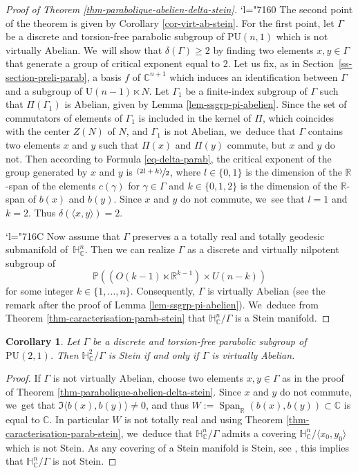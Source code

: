 \documentclass[JEP,XML,SOM,Unicode,NoEqCountersInSection,published]{cedram}
\newcommand{\Changel}{\mathcode`l="7160}
\newcommand{\Changelback}{\mathcode`l="716C}
\newcommand{\psfrac}[2]{\sfrac{(#1)}{#2}}
\newtheorem{corollary}[theorem]{Corollary}
\theoremstyle{definition}
\newcommand{\C}{\mathbb{C}}
\newcommand{\R}{\mathbb{R}}
\newcommand{\HNC}{\mathbb{H}^{n}_{\C}}
\newcommand{\PU}{\mathrm{PU}}
\def\C{\mathbb{C}}
\newcommand{\HNC}{\mathbb{H}^{n}_{\C}}
\newcommand{\PU}{\mathrm{PU}}
\begin{document}
\begin{proof}[Proof of Theorem \ref{thm-parabolique-abelien-delta-stein}]\Changel
The second point of the theorem is given by Corollary \ref{cor-virt-ab-stein}. For the first point, let $\Gamma$ be a discrete and torsion-free parabolic subgroup of $\PU(n,1)$ which is not virtually Abelian. We~will show that $\delta(\Gamma)\ge2$ by finding two elements $x,y\in \Gamma$ that generate a group of critical exponent equal to 2. Let us fix, as in Section~\ref{ss-section-preli-parab}, a basis $f$ of $\C^{n+1}$ which induces an identification between $\Gamma$ and a subgroup of $\mathrm{U}(n-1)\ltimes N$. Let $\Gamma_1$ be a finite-index subgroup of $\Gamma$ such that $\Pi(\Gamma_1)$ is Abelian, given by Lemma \ref{lem-ssgrp-pi-abelien}. Since the set of commutators of elements of $\Gamma_1$ is included in the kernel of $\Pi$, which coincides with the center $Z(N)$ of $N$, and $\Gamma_1$ is not Abelian, we~deduce that $\Gamma$ contains two elements $x$ and $y$ such that $\Pi(x)$ and $\Pi(y)$ commute, but $x$ and $y$ do not. Then according to Formula \eqref{eq-delta-parab}, the critical exponent of the group generated by $x$ and $y$ is $\psfrac{2l+k}{2}$, where $l\in\{0,1\}$ is the dimension of the $\R$-span of the elements $c(\gamma)$ for $\gamma\in\Gamma$ and $k\in\{0,1,2\}$ is the dimension of the $\R$-span of $b(x)$ and $b(y)$. Since $x$ and $y$ do not commute, we~see that $l=1$ and $k=2$. Thus $\delta(\langle x,y\rangle)=2$.

\Changelback
Now assume that $\Gamma$ preserves a a totally real and totally geodesic submanifold of~$\HNC$. Then we can realize $\Gamma$ as a discrete and virtually nilpotent subgroup of
\begin{equation*}
\mathbb{P}((O(k-1)\ltimes \R^{k-1})\times U(n-k))
\end{equation*}for some integer $k\in\{1,\dots,n\}$. Consequently, $\Gamma$ is virtually Abelian (see the remark after the proof of Lemma \ref{lem-ssgrp-pi-abelien}). We~deduce from Theorem \ref{thm-caracterisation-parab-stein} that $\HNC/\Gamma$ is a Stein manifold.
\end{proof}

\begin{corollary}\label{cor-parab-dim2}
Let $\Gamma$ be a discrete and torsion-free parabolic subgroup of $\PU(2,1)$. Then $\mathbb{H}^{2}_{\C}/\Gamma$ is Stein if and only if $\Gamma$ is virtually Abelian.
\end{corollary}

\begin{proof}
If $\Gamma$ is not virtually Abelian, choose two elements $x,y\in \Gamma$ as in the proof of Theorem \ref{thm-parabolique-abelien-delta-stein}. Since $x$ and $y$ do not commute, we~get that $\Im\langle b(x),b(y)\rangle \ne 0$, and thus $W:=\operatorname{Span}_{\R}(b(x),b(y))\subset\C$ is equal to $\C$. In particular $W$ is not totally real and using Theorem \ref{thm-caracterisation-parab-stein}, we~deduce that $\HNC/\Gamma$ admits a covering $\HNC/\langle x_0,y_0\rangle$ which is not Stein. As any covering of a Stein manifold is Stein, see \cite{steinUberlagerungenHolomorphvollstandigerKomplexer1956}, this implies that $\HNC/\Gamma$ is not Stein.
\end{proof}
\end{document}
